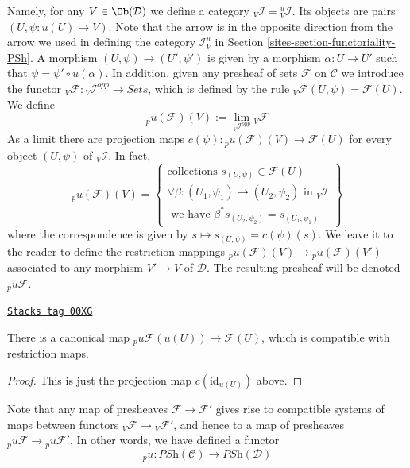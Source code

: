 \medskip\noindent
Namely, for any $V \in \Ob(\mathcal{D})$
we define a category ${}_V\mathcal{I} = {}_V^u\mathcal{I}$.
Its objects are pairs $(U, \psi : u(U) \to V)$.
Note that the arrow is in the opposite direction from the arrow
we used in defining the category $\mathcal{I}_V^u$ in
Section \ref{sites-section-functoriality-PSh}.
A morphism $(U, \psi) \to (U', \psi')$ is given
by a morphism $\alpha : U \to U'$ such that
$\psi = \psi' \circ u(\alpha)$.
In addition, given any presheaf of sets $\mathcal{F}$
on $\mathcal{C}$ we introduce the functor
${}_V\mathcal{F} : {}_V\mathcal{I}^{opp} \to \textit{Sets}$,
which is defined by the rule
${}_V\mathcal{F}(U, \psi) = \mathcal{F}(U)$. We define
$$
{}_pu(\mathcal{F})(V) := \lim_{{}_V\mathcal{I}^{opp}} {}_V\mathcal{F}
$$
As a limit there are projection maps
$c(\psi) : {}_pu(\mathcal{F})(V) \to \mathcal{F}(U)$
for every object $(U, \psi)$ of ${}_V\mathcal{I}$.
In fact,
$$
{}_pu(\mathcal{F})(V)
=
\left\{
\begin{matrix}
\text{collections }
s_{(U, \psi)} \in \mathcal{F}(U) \\
\forall \beta : (U_1, \psi_1) \to (U_2, \psi_2)
\text{ in }{}_V\mathcal{I} \\
\text{ we have } \beta^*s_{(U_2, \psi_2)} = s_{(U_1, \psi_1)}
\end{matrix}
\right\}
$$
where the correspondence is given by $s \mapsto s_{(U, \psi)} = c(\psi)(s)$.
We leave it to the reader to define the restriction mappings
${}_pu(\mathcal{F})(V) \to {}_pu(\mathcal{F})(V')$
associated to any morphism $V' \to V$ of $\mathcal{D}$.
The resulting presheaf will be denoted ${}_pu\mathcal{F}$.

\begin{lemma}[Recover pu]
\label{sites-lemma-recover-pu}
\href{https://stacks.math.columbia.edu/tag/00XG}{\texttt{Stacks tag 00XG}}

There is a canonical map
${}_pu\mathcal{F}(u(U)) \to \mathcal{F}(U)$,
which is compatible with restriction maps.
\end{lemma}

\begin{proof}
This is just the projection map $c(\text{id}_{u(U)})$ above.
\end{proof}

Note that any map of presheaves $\mathcal{F} \to \mathcal{F}'$
gives rise to compatible systems of maps between functors
${}_V\mathcal{F} \to {}_V\mathcal{F}'$, and hence to a map
of presheaves ${}_pu\mathcal{F} \to {}_pu\mathcal{F}'$. In other
words, we have defined a functor
$$
{}_pu :
\textit{PSh}(\mathcal{C})
\longrightarrow
\textit{PSh}(\mathcal{D})
$$

